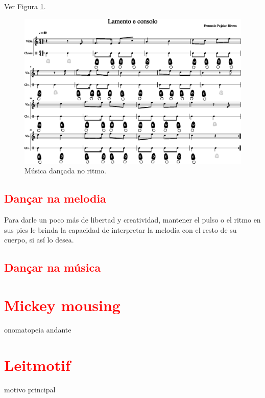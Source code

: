 Ver Figura \ref{fig:lamentoconsoloritmo1}.
\begin{figure}
    \centering
    \includegraphics[width=\textwidth]{chapters/cap-musica-musicalidade/lamento-e-consolo-clave-ritmo-1.eps}
    \caption{Música dançada no ritmo.}
    \label{fig:lamentoconsoloritmo1}
\end{figure}

\subsection{\textcolor{red}{Dançar na melodia}}
Para darle un poco más de libertad y creatividad, mantener el pulso o el ritmo en sus pies le brinda la capacidad de interpretar la melodía con el resto de su cuerpo, si así lo desea.

\subsection{\textcolor{red}{Dançar na música}}

\section{\textcolor{red}{Mickey mousing}}
onomatopeia andante


\section{\textcolor{red}{Leitmotif}}
motivo principal \cite[pp. 7]{bribitzer2015understanding} \cite[pp. 465]{apel1969harvard}


